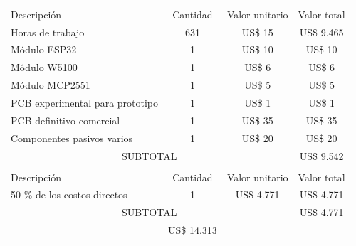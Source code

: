 \documentclass[
11pt, %
]{charter}
\begin{document}
\begin{table}[htpb]
\centering
\begin{tabularx}{\linewidth}{@{}|X|c|r|r|@{}}
\hline
\rowcolor[HTML]{C0C0C0} 
\multicolumn{4}{|c|}{\cellcolor[HTML]{C0C0C0}COSTOS DIRECTOS} \\ \hline
\rowcolor[HTML]{C0C0C0} 
Descripción &
  \multicolumn{1}{c|}{\cellcolor[HTML]{C0C0C0}Cantidad} &
  \multicolumn{1}{c|}{\cellcolor[HTML]{C0C0C0}Valor unitario} &
  \multicolumn{1}{c|}{\cellcolor[HTML]{C0C0C0}Valor total} \\ \hline
\multicolumn{1}{|l|}{Horas de trabajo} &631
   &\multicolumn{1}{c|}{US\$ 15}
   &\multicolumn{1}{c|}{US\$ 9.465}
   \\ \hline
\multicolumn{1}{|l|}{Módulo ESP32} &1
   &\multicolumn{1}{c|}{US\$ 10}
   &\multicolumn{1}{c|}{US\$ 10}
   \\ \hline
\multicolumn{1}{|l|}{Módulo W5100} &1
   &\multicolumn{1}{c|}{US\$ 6}
   &\multicolumn{1}{c|}{US\$ 6}
   \\ \hline
\multicolumn{1}{|l|}{Módulo MCP2551} &1
   &\multicolumn{1}{c|}{US\$ 5}
   &\multicolumn{1}{c|}{US\$ 5}
   \\ \hline
\multicolumn{1}{|l|}{PCB experimental para prototipo} &1
   &\multicolumn{1}{c|}{US\$ 1}
   &\multicolumn{1}{c|}{US\$ 1}
   \\ \hline
\multicolumn{1}{|l|}{PCB definitivo comercial} &1
   &\multicolumn{1}{c|}{US\$ 35}
   &\multicolumn{1}{c|}{US\$ 35}
   \\ \hline
\multicolumn{1}{|l|}{Componentes pasivos varios} &1
   &\multicolumn{1}{c|}{US\$ 20}
   &\multicolumn{1}{c|}{US\$ 20}
   \\ \hline
\multicolumn{3}{|c|}{SUBTOTAL} &
  \multicolumn{1}{c|}{US\$ 9.542} \\ \hline
\rowcolor[HTML]{C0C0C0} 
\multicolumn{4}{|c|}{\cellcolor[HTML]{C0C0C0}COSTOS INDIRECTOS} \\ \hline
\rowcolor[HTML]{C0C0C0} 
Descripción &
  \multicolumn{1}{c|}{\cellcolor[HTML]{C0C0C0}Cantidad} &
  \multicolumn{1}{c|}{\cellcolor[HTML]{C0C0C0}Valor unitario} &
  \multicolumn{1}{c|}{\cellcolor[HTML]{C0C0C0}Valor total} \\ \hline
\multicolumn{1}{|l|}{50 \% de los costos directos } &\multicolumn{1}{c|}{1}
   &\multicolumn{1}{c|}{US\$ 4.771}
   &\multicolumn{1}{c|}{US\$ 4.771}
   \\ \hline
\multicolumn{3}{|c|}{SUBTOTAL} &
  \multicolumn{1}{c|}{US\$ 4.771} \\ \hline
\rowcolor[HTML]{C0C0C0}
\multicolumn{3}{|c|}{TOTAL} & \multicolumn{1}{c|}{US\$ 14.313}
   \\ \hline
\end{tabularx}%
\end{table}
\end{document}
